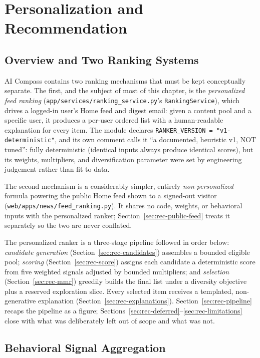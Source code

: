 \chapter{Personalization and Recommendation}
\label{ch:recommendation}

\section{Overview and Two Ranking Systems}
\label{sec:rec-overview}

AI Compass contains two ranking mechanisms that must be kept conceptually separate. The first, and the subject of most of this chapter, is the \emph{personalized feed ranking} (\texttt{app/services/ranking\_service.py}'s \texttt{RankingService}), which drives a logged-in user's Home feed and digest email: given a content pool and a specific user, it produces a per-user ordered list with a human-readable explanation for every item. The module declares \texttt{RANKER\_VERSION = "v1-deterministic"}, and its own comment calls it ``a documented, heuristic v1, NOT tuned'': fully deterministic (identical inputs always produce identical scores), but its weights, multipliers, and diversification parameter were set by engineering judgement rather than fit to data.

The second mechanism is a considerably simpler, entirely \emph{non-personalized} formula powering the public Home feed shown to a signed-out visitor (\texttt{web/apps/news/feed\_ranking.py}). It shares no code, weights, or behavioral inputs with the personalized ranker; Section~\ref{sec:rec-public-feed} treats it separately so the two are never conflated.

The personalized ranker is a three-stage pipeline followed in order below: \emph{candidate generation} (Section~\ref{sec:rec-candidates}) assembles a bounded eligible pool; \emph{scoring} (Section~\ref{sec:rec-score}) assigns each candidate a deterministic score from five weighted signals adjusted by bounded multipliers; and \emph{selection} (Section~\ref{sec:rec-mmr}) greedily builds the final list under a diversity objective plus a reserved exploration slice. Every selected item receives a templated, non-generative explanation (Section~\ref{sec:rec-explanations}). Section~\ref{sec:rec-pipeline} recaps the pipeline as a figure; Sections~\ref{sec:rec-deferred}--\ref{sec:rec-limitations} close with what was deliberately left out of scope and what was not.

\section{Behavioral Signal Aggregation}
\label{sec:rec-signals}


